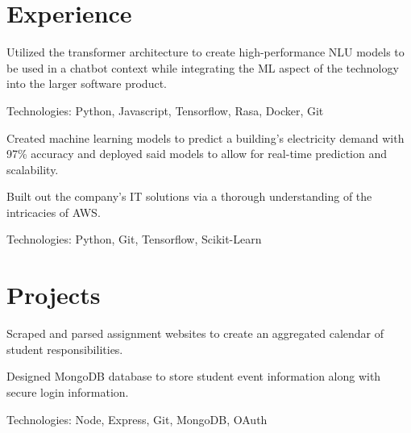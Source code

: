 \documentclass[]{deedy-resume-openfont}
\begin{document}
%
%
\lastupdated

%
%

%
%

\begin{minipage}[t]{0.64\textwidth} 


\section{Experience}
\vspace{\topsep} %
\begin{tightemize}
    \item Utilized the transformer architecture to create high-performance NLU models to be used
    in a chatbot context while integrating the ML aspect of the technology into the larger software product.
    \item Technologies: Python, Javascript, Tensorflow, Rasa, Docker, Git
    \end{tightemize}
\sectionsep

\begin{tightemize}
\item Created machine learning models to predict a building's electricity demand with 97\% 
accuracy and deployed said models to allow for real-time prediction and scalability.
\item Built out the company's IT solutions via a thorough understanding of the intricacies of AWS. 
\item Technologies: Python, Git, Tensorflow, Scikit-Learn
\end{tightemize}
\sectionsep

\section{Projects}
\descript{}
\location{}
\begin{tightemize}
    \item Scraped and parsed assignment websites to create an aggregated calendar of
    student responsibilities.
    \item Designed MongoDB database to store student event information along with secure
    login information. 
    \item Technologies: Node, Express, Git, MongoDB, OAuth
\end{tightemize}
\sectionsep


\end{minipage}
\end{document}

